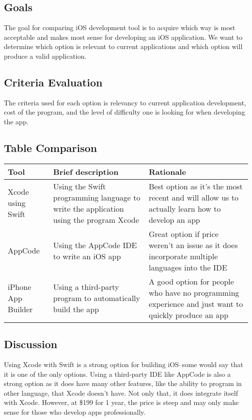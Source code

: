 \documentclass[letterpaper,10pt,draftclsnofoot,onecolumn,titlepage]{IEEEtran}
\begin{document}
	\subsection{Goals}
	The goal for comparing iOS development tool is to acquire which way is most acceptable and makes most sense for developing an iOS application.
	We want to determine which option is relevant to current applications and which option will produce a valid application.
	\subsection{Criteria Evaluation}
	The criteria used for each option is relevancy to current application development, cost of the program, and the level of difficulty one is looking for when developing the app.
	\subsection{Table Comparison}


	\begin{center}
	\begin{tabular} { | m{3cm} | m{5cm} | m{5cm} | }
	\hline\hline
	Tool & Brief description & Rationale \\ [0.5ex]
	\hline
	Xcode using Swift & Using the Swift programming language to write the application using the program Xcode & Best option as it's the most recent and will allow us to actually learn how to develop an app \\
	\hline
	AppCode & Using the AppCode IDE to write an iOS app & Great option if price weren't an issue as it does incorporate multiple languages into the IDE \\
	\hline
	iPhone App Builder & Using a third-party program to automatically build the app & A good option for people who have no programming experience and just want to quickly produce an app \\
	\hline
	\end{tabular}
	\end{center}


	\subsection{Discussion}
	Using Xcode with Swift is a strong option for building iOS--some would say that it is one of the only options.
	Using a third-party IDE like AppCode is also a strong option as it does have many other features, like the ability to program in other language, that Xcode doesn't have. Not only that, it does integrate itself with Xcode. However, at \$199 for 1 year, the price is steep and may only make sense for those who develop apps professionally.
\end{document}
